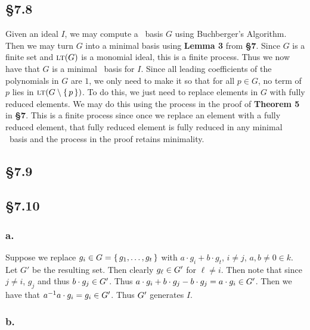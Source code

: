 \documentclass[letterpaper]{article}
\begin{document}
\subsection{\S 7.8}

Given an ideal $I$, we may compute a \Grobner\ basis $G$ using Buchberger's Algorithm. Then we may turn $G$ into a minimal basis using \textbf{Lemma 3} from \textbf{\S 7}. Since $G$ is a finite set and $\gen{\lt(G)}$ is a monomial ideal, this is a finite process. Thus we now have that $G$ is a minimal \Grobner\ basis for $I$. Since all leading coefficients of the polynomials in $G$ are $1$, we only need to make it so that for all $p \in G$, no term of $p$ lies in $\gen{\lt(G \setminus \set{p})}$. To do this, we just need to replace elements in $G$ with fully reduced elements. We may do this using the process in the proof of \textbf{Theorem 5} in \textbf{\S 7}. This is a finite process since once we replace an element with a fully reduced element, that fully reduced element is fully reduced in any minimal \Grobner\ basis and the process in the proof retains minimality.

\subsection{\S 7.9}


\subsection{\S 7.10}

\subsubsection{a.}

Suppose we replace $g_{i} \in G = \set{g_{1}, \ldots, g_{t}}$ with $a \cdot g_{i} + b \cdot g_{t}$, $i \neq j$, $a,b \neq 0 \in k$. Let $G'$ be the resulting set. Then clearly $g_{\ell} \in \gen{G'}$ for $\ell \neq i$. Then note that since $j \neq i$, $g_{j}$ and thus $b \cdot g_{j} \in \gen{G'}$. Thus $a \cdot g_{i} + b \cdot g_{j} - b \cdot g_{j} = a \cdot g_{i} \in \gen{G'}$. Then we have that $a^{-1} a \cdot g_{i} = g_{i} \in \gen{G'}$. Thus $\gen{G'}$ generates $I$.

\clearpage

\subsubsection{b.}
\end{document}
